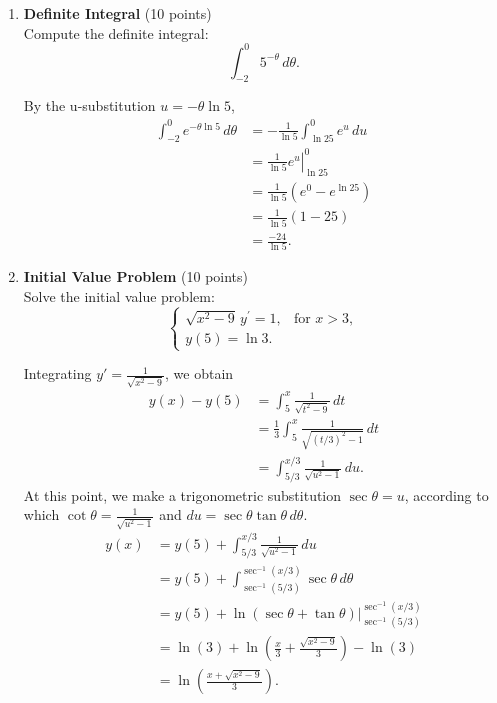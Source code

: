 \begin{enumerate}
  \newpage







  \item \textbf{Definite Integral} (10 points)\\
  Compute the definite integral:
  \[
  \int_{-2}^0 5^{-\theta} \, d\theta.
  \]
  \begin{subanswer}[red]
    By the u-substitution \(u = -\theta \ln 5\), 
  \[
  \begin{aligned}
  \int_{-2}^0 e^{-\theta \ln 5} \, d\theta 
  &= -\frac{1}{\ln 5} \int_{\ln 25}^0 e^u \, du \\
  &= \left. \frac{1}{\ln 5} e^u \right|_{\ln 25}^0 \\
  &= \frac{1}{\ln 5} (e^0 - e^{\ln 25}) \\
  &= \frac{1}{\ln 5} (1 - 25) \\
  &= \frac{-24}{\ln 5}.
  \end{aligned}
  \]
  \end{subanswer}

  \item \textbf{Initial Value Problem} (10 points)\\
  Solve the initial value problem:
  \[
  \begin{cases}
  \sqrt{x^2 - 9} \, y^{\prime} = 1, & \text{for } x > 3, \\
  y(5) = \ln 3.
  \end{cases}
  \]
  \begin{subanswer}[red]
    Integrating \( y' = \frac{1}{\sqrt{x^2-9}} \), we obtain
    \[
    \begin{aligned}
    y(x) - y(5) &= \int_5^x \frac{1}{\sqrt{t^2-9}} \, dt \\
    &= \frac{1}{3} \int_5^x \frac{1}{\sqrt{(t/3)^2 - 1}} \, dt \\
    &= \int_{5/3}^{x/3} \frac{1}{\sqrt{u^2-1}} \, du.
    \end{aligned}
    \]
    At this point, we make a trigonometric substitution \( \sec \theta = u \), according to which \( \cot \theta = \frac{1}{\sqrt{u^2-1}} \) and \( du = \sec \theta \tan \theta \, d\theta \).
    \[
    \begin{aligned}
    y(x) &= y(5) + \int_{5/3}^{x/3} \frac{1}{\sqrt{u^2-1}} \, du \\
    &= y(5) + \int_{\sec^{-1}(5/3)}^{\sec^{-1}(x/3)} \sec \theta \, d\theta \\
    &= y(5) + \left. \ln(\sec \theta + \tan \theta) \right|_{\sec^{-1}(5/3)}^{\sec^{-1}(x/3)} \\
    &= \ln(3) + \ln\left(\frac{x}{3} + \frac{\sqrt{x^2-9}}{3}\right) - \ln(3) \\
    &= \ln\left( \frac{x + \sqrt{x^2-9}}{3} \right).
    \end{aligned}
    \]
  \end{subanswer}












\end{enumerate}
